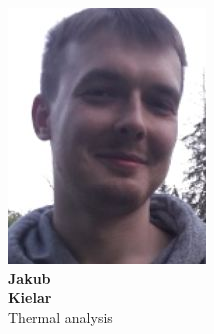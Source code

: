 \documentclass[xcolor=dvipsnames]{beamer}%
\begin{document}
\begin{frame}
\begin{columns}
\begin{minipage}[c][0.3\textheight][c]{\linewidth}
  \centering
    \includegraphics[height=0.2\textheight]{figure/jakub_kielar.JPG} \\
    \textbf{Jakub}\\\textbf{Kielar}\\
    Thermal analysis
\end{minipage}


\end{columns}
\end{frame}
\end{document}
